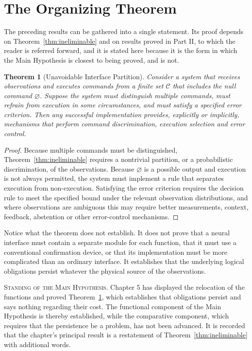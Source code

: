 \documentclass[11pt,twoside,openany]{book}
\newtheorem{theorem}{Theorem}[chapter]
\theoremstyle{definition}
\theoremstyle{remark}
\newcommand{\C}{\mathcal{C}}
\newenvironment{standing}{\par\medskip\noindent\hrulefill\par\smallskip\noindent\textsc{Standing of the Main Hypothesis.}\enspace}{\par\smallskip\noindent\hrulefill\par\medskip}
\begin{document}
\section{The Organizing Theorem}

The preceding results can be gathered into a single statement. Its proof depends on Theorem~\ref{thm:ineliminable} and on results proved in Part II, to which the reader is referred forward, and it is stated here because it is the form in which the Main Hypothesis is closest to being proved, and is not.

\begin{theorem}[Unavoidable Interface Partition]\label{thm:partition}
Consider a system that receives observations and executes commands from a finite set $\C$ that includes the null command $\varnothing$. Suppose the system must distinguish multiple commands, must refrain from execution in some circumstances, and must satisfy a specified error criterion. Then any successful implementation provides, explicitly or implicitly, mechanisms that perform command discrimination, execution selection and error control.
\end{theorem}
\begin{proof}
Because multiple commands must be distinguished, Theorem~\ref{thm:ineliminable} requires a nontrivial partition, or a probabilistic discrimination, of the observations. Because $\varnothing$ is a possible output and execution is not always permitted, the system must implement a rule that separates execution from non-execution. Satisfying the error criterion requires the decision rule to meet the specified bound under the relevant observation distributions, and where observations are ambiguous this may require better measurements, context, feedback, abstention or other error-control mechanisms.
\end{proof}

Notice what the theorem does not establish. It does not prove that a neural interface must contain a separate module for each function, that it must use a conventional confirmation device, or that its implementation must be more complicated than an ordinary interface. It establishes that the underlying logical obligations persist whatever the physical source of the observations.

\begin{standing}
Chapter 5 has displayed the relocation of the functions and proved Theorem~\ref{thm:partition}, which establishes that obligations persist and says nothing regarding their cost. The functional component of the Main Hypothesis is thereby established, while the comparative component, which requires that the persistence be a problem, has not been advanced. It is recorded that the chapter's principal result is a restatement of Theorem~\ref{thm:ineliminable} with additional words.
\end{standing}
\end{document}
